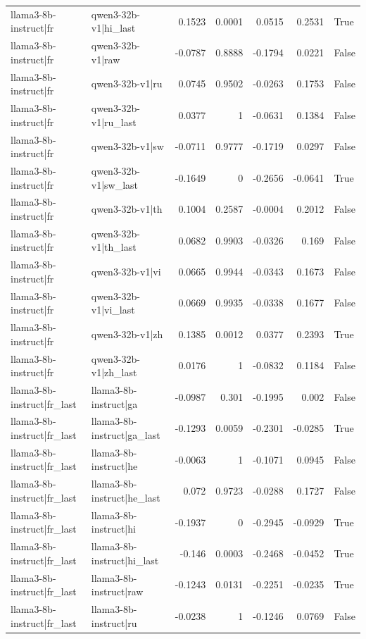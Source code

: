 \begin{table}
\begin{tabular}{l l r r r r l}
llama3-8b-instruct|fr & qwen3-32b-v1|hi_last & 0.1523 & 0.0001 & 0.0515 & 0.2531 & True \\
llama3-8b-instruct|fr & qwen3-32b-v1|raw & -0.0787 & 0.8888 & -0.1794 & 0.0221 & False \\
llama3-8b-instruct|fr & qwen3-32b-v1|ru & 0.0745 & 0.9502 & -0.0263 & 0.1753 & False \\
llama3-8b-instruct|fr & qwen3-32b-v1|ru_last & 0.0377 & 1 & -0.0631 & 0.1384 & False \\
llama3-8b-instruct|fr & qwen3-32b-v1|sw & -0.0711 & 0.9777 & -0.1719 & 0.0297 & False \\
llama3-8b-instruct|fr & qwen3-32b-v1|sw_last & -0.1649 & 0 & -0.2656 & -0.0641 & True \\
llama3-8b-instruct|fr & qwen3-32b-v1|th & 0.1004 & 0.2587 & -0.0004 & 0.2012 & False \\
llama3-8b-instruct|fr & qwen3-32b-v1|th_last & 0.0682 & 0.9903 & -0.0326 & 0.169 & False \\
llama3-8b-instruct|fr & qwen3-32b-v1|vi & 0.0665 & 0.9944 & -0.0343 & 0.1673 & False \\
llama3-8b-instruct|fr & qwen3-32b-v1|vi_last & 0.0669 & 0.9935 & -0.0338 & 0.1677 & False \\
llama3-8b-instruct|fr & qwen3-32b-v1|zh & 0.1385 & 0.0012 & 0.0377 & 0.2393 & True \\
llama3-8b-instruct|fr & qwen3-32b-v1|zh_last & 0.0176 & 1 & -0.0832 & 0.1184 & False \\
llama3-8b-instruct|fr_last & llama3-8b-instruct|ga & -0.0987 & 0.301 & -0.1995 & 0.002 & False \\
llama3-8b-instruct|fr_last & llama3-8b-instruct|ga_last & -0.1293 & 0.0059 & -0.2301 & -0.0285 & True \\
llama3-8b-instruct|fr_last & llama3-8b-instruct|he & -0.0063 & 1 & -0.1071 & 0.0945 & False \\
llama3-8b-instruct|fr_last & llama3-8b-instruct|he_last & 0.072 & 0.9723 & -0.0288 & 0.1727 & False \\
llama3-8b-instruct|fr_last & llama3-8b-instruct|hi & -0.1937 & 0 & -0.2945 & -0.0929 & True \\
llama3-8b-instruct|fr_last & llama3-8b-instruct|hi_last & -0.146 & 0.0003 & -0.2468 & -0.0452 & True \\
llama3-8b-instruct|fr_last & llama3-8b-instruct|raw & -0.1243 & 0.0131 & -0.2251 & -0.0235 & True \\
llama3-8b-instruct|fr_last & llama3-8b-instruct|ru & -0.0238 & 1 & -0.1246 & 0.0769 & False \\

\end{tabular}
\end{table}
